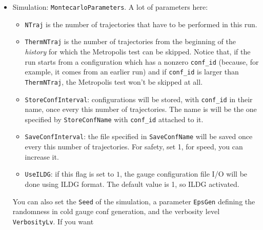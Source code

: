 \begin{itemize}
    \item{Simulation: \verb|MontecarloParameters|.} A lot of parameters here: 
        \begin{itemize}
            \item \verb|NTraj| is the number of trajectories that have to be performed in 
                this run.
            \item \verb|ThermNTraj| is the number of trajectories from the beginning of the 
                \emph{history} for which the Metropolis test can be skipped. Notice that, if 
                the run starts from a configuration which has a nonzero \verb|conf_id| 
                (because, for example, it comes from an earlier run) and if \verb|conf_id| is 
                larger than \verb|ThermNTraj|, the Metropolis test won't be skipped at all.
            \item \verb|StoreConfInterval|: configurations will be stored, with 
                \verb|conf_id| in their name, once every this number of trajectories. The name 
                is will be the one specified by \verb|StoreConfName| with \verb|conf_id| 
                attached to it. 
            \item \verb|SaveConfInterval|: the file specified in \verb|SaveConfName| will 
                be saved once every this number of trajectories. For safety, set 1, for speed, 
                you can increase it.
            \item \verb|UseILDG|: if this flag is set to $1$, the gauge configuration file 
                I/O will be done using ILDG format. The default value is 1, so ILDG activated.
        \end{itemize}
        You can also set the \verb|Seed| of the simulation, a parameter 
        \verb|EpsGen| defining the randomness in cold gauge conf generation, and the 
        verbosity level \verb|VerbosityLv|. If you want 


\end{itemize}
